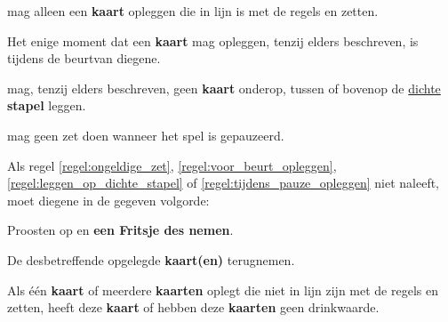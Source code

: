 \footnotetext[1]{\footnoteEenDubbeleFritsNemen}
\footnotetext[3]{\footnoteFritsjeDesNemen}


\newpage
{}


\vervolgLijst{}
\item \EenSpeler mag alleen een \textbf{kaart} opleggen die in lijn is met de regels en zetten.
\label{regel:ongeldige_zet}
\eindLijst{}

\vervolgLijst{}
\item Het enige moment dat \eenSpeler een \textbf{kaart} mag opleggen, tenzij elders beschreven, is tijdens de beurt\footnotemark[1] van diegene.
\label{regel:voor_beurt_opleggen}
\eindLijst{}

\vervolgLijst{}
\item \EenSpeler mag, tenzij elders beschreven, geen \textbf{kaart} onderop, tussen of bovenop de \ul{dichte} \textbf{stapel} leggen.
\label{regel:leggen_op_dichte_stapel}
\eindLijst{}

\vervolgLijst{}
\item \EenSpeler mag geen zet doen wanneer het spel is gepauzeerd\footnotemark[2].
\label{regel:tijdens_pauze_opleggen}
\eindLijst{}

\vervolgLijst{}
\item Als \eenSpeler regel \ref{regel:ongeldige_zet}, \ref{regel:voor_beurt_opleggen}, \ref{regel:leggen_op_dichte_stapel} of \ref{regel:tijdens_pauze_opleggen} niet naleeft, moet diegene in de gegeven volgorde:
\puntLijst{}
\item Proosten op  en \textbf{een Fritsje des nemen}\footnotemark[3].
\item De desbetreffende opgelegde \textbf{kaart(en)} terugnemen.
\eindPuntLijst{}
\label{regel:kaarten_terugnemen_2}
\eindLijst{}

\vervolgLijst{}
\item Als \eenSpeler één \textbf{kaart} of meerdere \textbf{kaarten} oplegt die niet in lijn zijn met de regels en zetten, heeft deze \textbf{kaart} of hebben deze \textbf{kaarten} geen drinkwaarde.
\eindLijst{}

